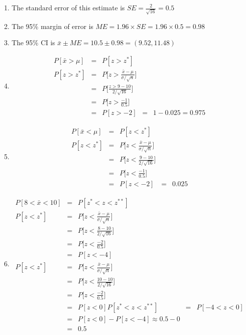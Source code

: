 \documentclass[11pt, chapterprefix=true]{scrbook}\usepackage[]{graphicx}\usepackage[]{color}
\begin{document}
\begin{exercises}
\begin{solution}
\begin{enumerate}
  \item The standard error of this estimate is $SE = \frac{2}{\sqrt{16}} = 0.5$
  \item The 95\% margin of error is $ME = 1.96 \times SE = 1.96 \times 0.5 = 0.98$
  \item The 95\% CI is $\bar{x} \pm ME = 10.5 \pm 0.98 = (9.52, 11.48) $ 
  \item 
  \begin{eqnarray*}
      P[ \bar{x} > \mu ] &=& P[z > z^*] \\
       P[z > z^*] &=& P\Big[ z > \frac{ \bar{x}-\mu}{ \sigma/\sqrt{n}} \Big] \\
       &=& P\Big[ \frac{z > 9 - 10}{ 2/\sqrt{16}} \Big] \\
       &=& P\Big[ z > \frac{-1}{0.5} \Big]   \\
        &=& P[z > -2]
        &=& 1 - 0.025 = 0.975
  \end{eqnarray*}
  
  \item 
  \begin{eqnarray*}
      P[ \bar{x} < \mu ] &=& P[z < z^*] \\
       P[z < z^*] &=& P\Big[ z < \frac{ \bar{x}-\mu}{ \sigma/\sqrt{n}} \Big] \\
       &=& P\Big[ z < \frac{ 9 - 10}{ 2/\sqrt{16}} \Big] \\
       &=& P\Big[ z < \frac{-1}{0.5} \Big]   \\
        &=& P[z < -2]
        &=&  0.025
  \end{eqnarray*}
 
  \item 
  \begin{eqnarray*}
      P[ 8 < \bar{x} < 10 ] &=& P[ z^* < z < z^{**} ] \\
       P[z < z^*] &=& P\Big[ z < \frac{ \bar{x}-\mu}{ \sigma/\sqrt{n}} \Big] \\
       &=& P\Big[ z < \frac{ 8 - 10}{ 2/\sqrt{16}} \Big] \\
       &=& P\Big[ z < \frac{-2}{0.5} \Big]   \\
        &=& P[z < -4] \\
        P[z < z^*] &=& P\Big[ z < \frac{ \bar{x}-\mu}{ \sigma/\sqrt{n}} \Big] \\
       &=& P\Big[ z < \frac{ 10 - 10}{ 2/\sqrt{16}} \Big] \\
       &=& P\Big[ z < \frac{-2}{0.5} \Big]   \\
        &=& P[z < 0]
      P[ z^* < z < z^{**} ] &=& P[ -4 < z < 0] \\  
        &=&  P[ z < 0 ] - P[z < -4] \approx 0.5 - 0 \\
        &=& 0.5
  \end{eqnarray*}
  

\end{enumerate}
\end{solution}
\end{exercises}
\end{document}
